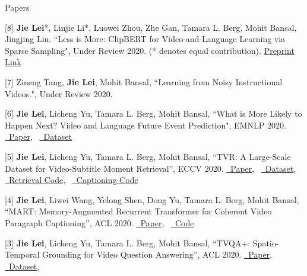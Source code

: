 \documentclass{resume} %
\begin{document}

\begin{rSection}{Papers}
    \item {[8] \textbf{Jie Lei}*, Linjie Li*, Luowei Zhou, Zhe Gan, Tamara L. Berg, Mohit Bansal, Jingjing Liu.
   ``Less is More: ClipBERT for Video-and-Language Learning via Sparse Sampling",
   Under Review 2020. (* denotes equal contribution).  \href{https://www.cs.unc.edu/~jielei/hidden/less_is_more_preprint.pdf}{\color{codelinkcolor}Preprint Link}
   }        
    \item {[7] Zineng Tang, \textbf{Jie Lei}, Mohit Bansal,
   ``Learning from Noisy Instructional Videos.",
   Under Review 2020.    
   }    
    \item {[6] \textbf{Jie Lei}, Licheng Yu, Tamara L. Berg, Mohit Bansal,
   ``What is More Likely to Happen Next? Video and Language Future Event Prediction",
   EMNLP 2020.    
   \href{https://arxiv.org/abs/2010.07999}{\color{codelinkcolor}\faFile~Paper},~
   \href{https://github.com/jayleicn/VideoLanguageFuturePred}{\color{codelinkcolor}\faDatabase~Dataset}
   }    
   \item {[5] \textbf{Jie Lei}, Licheng Yu, Tamara L. Berg, Mohit Bansal,
   ``TVR: A Large-Scale Dataset for Video-Subtitle Moment Retrieval'',
    ECCV 2020. 
    \href{https://arxiv.org/abs/2001.09099}{\color{codelinkcolor}\faFile~Paper},~
    \href{https://tvr.cs.unc.edu/}{\color{codelinkcolor}\faDatabase~Dataset},~
    \href{https://github.com/jayleicn/TVRetrieval}{\color{codelinkcolor}\faGithub~Retrieval Code},~
    \href{https://github.com/jayleicn/TVCaption}{\color{codelinkcolor}\faGithub~Captioning Code}
    } 
   \item {[4] \textbf{Jie Lei}, Liwei Wang, Yelong Shen, Dong Yu, Tamara L. Berg, Mohit Bansal,
         ``MART: Memory-Augmented Recurrent Transformer for Coherent Video Paragraph Captioning'',
         ACL 2020.
         \href{https://arxiv.org/abs/2005.05402}{\color{codelinkcolor}\faFile~Paper},~
         \href{https://github.com/jayleicn/recurrent-transformer}{\color{codelinkcolor}\faGithub~Code}
         }               
   \item {[3] \textbf{Jie Lei}, Licheng Yu, Tamara L. Berg, Mohit Bansal,
               ``TVQA+: Spatio-Temporal Grounding for Video Question Answering'',
               ACL 2020.
               \href{https://arxiv.org/abs/1904.11574}{\color{codelinkcolor}\faFile~Paper},~
               \href{http://tvqa.cs.unc.edu/}{\color{codelinkcolor}\faDatabase~Dataset},~
}
\end{rSection}
\end{document}
